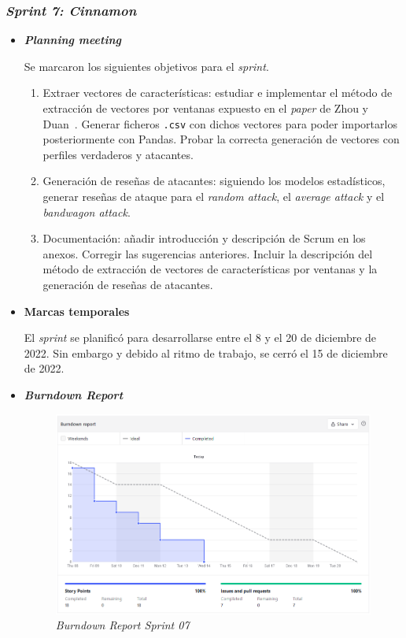 \subsubsection{\textit{Sprint 7: Cinnamon }}
\begin{itemize}
	\item \textbf{\textit{Planning meeting}}
	
	Se marcaron los siguientes objetivos para el \textit{sprint}.
	
	\begin{enumerate}
		\item Extraer vectores de características: estudiar e implementar el método de extracción de vectores por ventanas expuesto en el \textit{paper} de Zhou y Duan~\cite{zhou2021SemisupervisedRecommendationAttack}. Generar ficheros \texttt{.csv} con dichos vectores para poder importarlos posteriormente con Pandas. Probar la correcta generación de vectores con perfiles verdaderos y atacantes.
		\item Generación de reseñas de atacantes: siguiendo los modelos estadísticos, generar reseñas de ataque para el \textit{random attack}, el \textit{average attack} y el \textit{bandwagon attack}.
		\item Documentación: añadir introducción y descripción de Scrum en los anexos. Corregir las sugerencias anteriores. Incluir la descripción del método de extracción de vectores de características por ventanas y la generación de reseñas de atacantes.
	\end{enumerate}
	
	\item \textbf{Marcas temporales}		
	
	El \textit{sprint} se planificó para desarrollarse entre el 8 y el 20 de diciembre de 2022. Sin embargo y debido al ritmo de trabajo, se cerró el 15 de diciembre de 2022.
	
	\item \textbf{\textit{Burndown Report}}
	\begin{figure}[h]
		\caption{\textit{Burndown Report Sprint 07}}
		\centering
		\includegraphics[width=\textwidth]{../img/anexos/bdr/s07_bdr}
	\end{figure}


\end{itemize}

